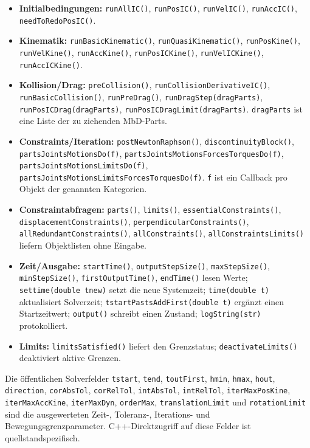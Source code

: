 \documentclass[
  12pt
]{book}
\providecommand{\tightlist}{%
  \setlength{\itemsep}{0pt}\setlength{\parskip}{0pt}}
\begin{document}
\begin{itemize}
\tightlist
\item
  \textbf{Initialbedingungen:} \texttt{runAllIC()}, \texttt{runPosIC()},
  \texttt{runVelIC()}, \texttt{runAccIC()}, \texttt{needToRedoPosIC()}.
\item
  \textbf{Kinematik:} \texttt{runBasicKinematic()},
  \texttt{runQuasiKinematic()}, \texttt{runPosKine()},
  \texttt{runVelKine()}, \texttt{runAccKine()}, \texttt{runPosICKine()},
  \texttt{runVelICKine()}, \texttt{runAccICKine()}.
\item
  \textbf{Kollision/Drag:} \texttt{preCollision()},
  \texttt{runCollisionDerivativeIC()}, \texttt{runBasicCollision()},
  \texttt{runPreDrag()}, \texttt{runDragStep(dragParts)},
  \texttt{runPosICDrag(dragParts)},
  \texttt{runPosICDragLimit(dragParts)}. \texttt{dragParts} ist eine
  Liste der zu ziehenden MbD-Parts.
\item
  \textbf{Constraints/Iteration:} \texttt{postNewtonRaphson()},
  \texttt{discontinuityBlock()}, \texttt{partsJointsMotionsDo(f)},
  \texttt{partsJointsMotionsForcesTorquesDo(f)},
  \texttt{partsJointsMotionsLimitsDo(f)},
  \texttt{partsJointsMotionsLimitsForcesTorquesDo(f)}. \texttt{f} ist
  ein Callback pro Objekt der genannten Kategorien.
\item
  \textbf{Constraintabfragen:} \texttt{parts()}, \texttt{limits()},
  \texttt{essentialConstraints()}, \texttt{displacementConstraints()},
  \texttt{perpendicularConstraints()},
  \texttt{allRedundantConstraints()}, \texttt{allConstraints()},
  \texttt{allConstraintsLimits()} liefern Objektlisten ohne Eingabe.
\item
  \textbf{Zeit/Ausgabe:} \texttt{startTime()},
  \texttt{outputStepSize()}, \texttt{maxStepSize()},
  \texttt{minStepSize()}, \texttt{firstOutputTime()}, \texttt{endTime()}
  lesen Werte; \texttt{settime(double\ tnew)} setzt die neue Systemzeit;
  \texttt{time(double\ t)} aktualisiert Solverzeit;
  \texttt{tstartPastsAddFirst(double\ t)} ergänzt einen Startzeitwert;
  \texttt{output()} schreibt einen Zustand; \texttt{logString(str)}
  protokolliert.
\item
  \textbf{Limits:} \texttt{limitsSatisfied()} liefert den Grenzstatus;
  \texttt{deactivateLimits()} deaktiviert aktive Grenzen.
\end{itemize}

Die öffentlichen Solverfelder \texttt{tstart}, \texttt{tend},
\texttt{toutFirst}, \texttt{hmin}, \texttt{hmax}, \texttt{hout},
\texttt{direction}, \texttt{corAbsTol}, \texttt{corRelTol},
\texttt{intAbsTol}, \texttt{intRelTol}, \texttt{iterMaxPosKine},
\texttt{iterMaxAccKine}, \texttt{iterMaxDyn}, \texttt{orderMax},
\texttt{translationLimit} und \texttt{rotationLimit} sind die
ausgewerteten Zeit-, Toleranz-, Iterations- und Bewegungsgrenzparameter.
C++-Direktzugriff auf diese Felder ist quellstandspezifisch.
\end{document}
